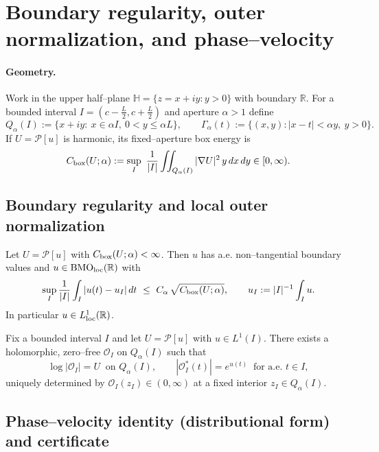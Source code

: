 
\section*{Boundary regularity, outer normalization, and phase–velocity}

\paragraph{Geometry.}
Work in the upper half–plane $\mathbb{H}=\{z=x+iy:y>0\}$ with boundary $\mathbb{R}$. For a bounded interval $I=(c-\tfrac{L}{2},c+\tfrac{L}{2})$ and aperture $\alpha>1$ define
\[
Q_\alpha(I):=\{x+iy:\ x\in \alpha I,\ 0<y\le \alpha L\},\qquad
\Gamma_\alpha(t):=\{(x,y): |x-t|<\alpha y,\ y>0\}.
\]
If $U=\mathcal P[u]$ is harmonic, its fixed–aperture box energy is
\[C_{\rm box}(U;\alpha):=\sup_{I}\ \frac{1}{|I|}\iint_{Q_\alpha(I)}|\nabla U|^2\,y\,dx\,dy\in[0,\infty).\]

\subsection*{Boundary regularity and local outer normalization}

\begin{lemma}\label{lem:BMO-outer}
Let $U=\mathcal P[u]$ with $C_{\rm box}(U;\alpha)<\infty$. Then $u$ has a.e. non–tangential boundary values and $u\in{\rm BMO}_{\rm loc}(\mathbb{R})$ with
\[\sup_{I}\frac{1}{|I|}\int_I |u(t)-u_I|\,dt\ \le\ C_\alpha\,\sqrt{C_{\rm box}(U;\alpha)},\qquad u_I:=|I|^{-1}\int_I u.\]
In particular $u\in L^1_{\rm loc}(\mathbb{R})$.
\end{lemma}

\begin{lemma}\label{lem:outer-local}
Fix a bounded interval $I$ and let $U=\mathcal P[u]$ with $u\in L^1(I)$. There exists a holomorphic, zero–free $\mathcal O_I$ on $Q_\alpha(I)$ such that
\[\log|\mathcal O_I|=U\ \text{ on }Q_\alpha(I),\qquad |\mathcal O_I^*(t)|=e^{u(t)}\ \text{ for a.e. }t\in I,\]
uniquely determined by $\mathcal O_I(z_I)\in(0,\infty)$ at a fixed interior $z_I\in Q_\alpha(I)$.
\end{lemma}

\subsection*{Phase–velocity identity (distributional form) and certificate}

